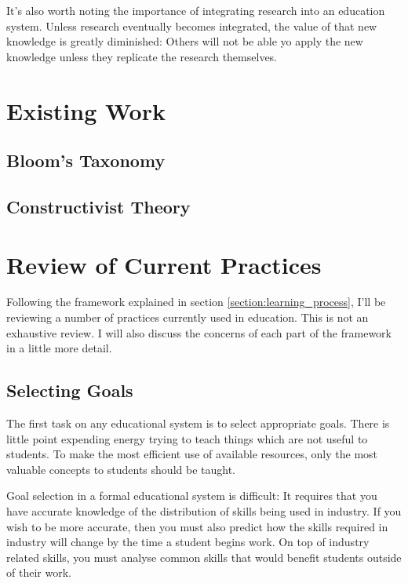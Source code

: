     It's also worth noting the importance of integrating research into an education system. Unless research eventually becomes integrated, the value of that new knowledge is greatly diminished: Others will not be able yo apply the new knowledge unless they replicate the research themselves.

  \section{Existing Work}

    \subsection{Bloom's Taxonomy}
    \subsection{Constructivist Theory}

  \section{Review of Current Practices}
    Following the framework explained in section \ref{section:learning_process}, I'll be reviewing a number of practices currently used in education. This is not an exhaustive review. I will also discuss the concerns of each part of the framework in a little more detail.

    \subsection{Selecting Goals}
      The first task on any educational system is to select appropriate goals. There is little point expending energy trying to teach things which are not useful to students. To make the most efficient use of available resources, only the most valuable concepts to students should be taught.

      Goal selection in a formal educational system is difficult: It requires that you have accurate knowledge of the distribution of skills being used in industry. If you wish to be more accurate, then you must also predict how the skills required in industry will change by the time a student begins work. On top of industry related skills, you must analyse common skills that would benefit students outside of their work.

